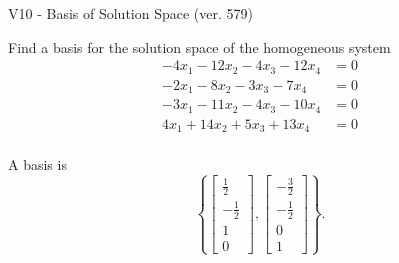 \begin{exercise}
  \begin{exerciseTitle}V10 - Basis of Solution Space (ver. 579)\end{exerciseTitle}
  \begin{exerciseStatement}
    Find a basis for the solution space of the homogeneous system 
\begin{align*}
 -4 x_ 1 -12 x_ 2 -4 x_ 3 -12 x_ 4 &= 0  \\ 
  -2 x_ 1 -8 x_ 2 -3 x_ 3 -7 x_ 4 &= 0  \\ 
  -3 x_ 1 -11 x_ 2 -4 x_ 3 -10 x_ 4 &= 0  \\ 
  4 x_ 1 + 14 x_ 2 + 5 x_ 3 + 13 x_ 4 &= 0  \\ 
 \end{align*}


 
  \end{exerciseStatement}

  \begin{exerciseAnswer}
   A basis is   
\[\left\{\left[\begin{array}{c}
\frac{1}{2} \\
-\frac{1}{2} \\
1 \\
0
\end{array}\right] , \left[\begin{array}{c}
-\frac{3}{2} \\
-\frac{1}{2} \\
0 \\
1
\end{array}\right]\right\}.\]

  


  \end{exerciseAnswer}
\end{exercise}